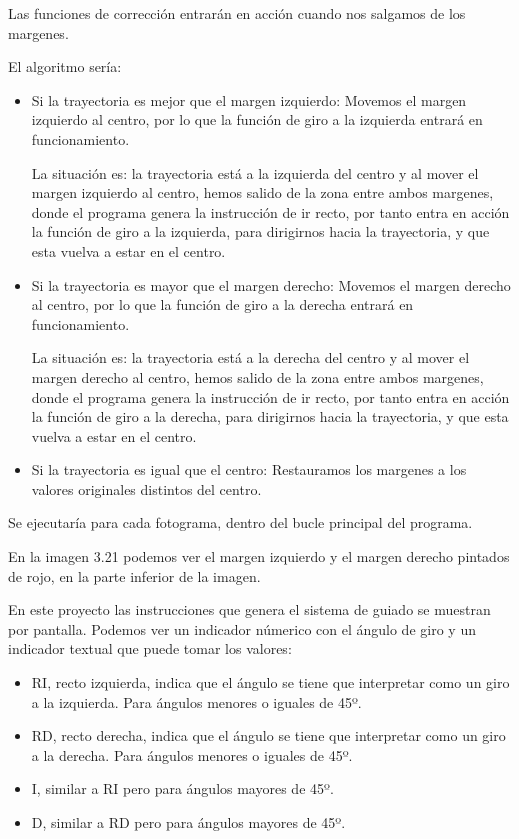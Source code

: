 Las funciones de corrección entrarán en acción cuando nos salgamos de los margenes. 

El algoritmo sería:

\begin{itemize}
	\item Si la trayectoria es mejor que el margen izquierdo:
	Movemos el margen izquierdo al centro, por lo que la función de giro a la izquierda entrará en funcionamiento. 
	
	La situación es: la trayectoria está a la izquierda del centro y al mover el margen izquierdo al centro, hemos salido de la zona entre ambos margenes, donde el programa genera la instrucción de ir recto, por tanto entra en acción la función de giro a la izquierda, para dirigirnos hacia la trayectoria, y que esta vuelva a estar en el centro.
	
	\item Si la trayectoria es mayor que el margen derecho:
	Movemos el margen derecho al centro, por lo que la función de giro a la derecha entrará en funcionamiento. 
	
	La situación es: la trayectoria está a la derecha del centro y al mover el margen derecho al centro, hemos salido de la zona entre ambos margenes, donde el programa genera la instrucción de ir recto, por tanto entra en acción la función de giro a la derecha, para dirigirnos hacia la trayectoria, y que esta vuelva a estar en el centro.
	
	\item Si la trayectoria es igual que el centro:
	Restauramos los margenes a los valores originales distintos del centro.
	
\end{itemize}

Se ejecutaría para cada fotograma, dentro del bucle principal del programa.

En la imagen 3.21 podemos ver el margen izquierdo y el margen derecho pintados de rojo, en la parte inferior de la imagen.

En este proyecto las instrucciones que genera el sistema de guiado se muestran por pantalla. Podemos ver un indicador númerico con el ángulo de giro y un indicador textual que puede tomar los valores:

\begin{itemize}

	\item RI, recto izquierda, indica que el ángulo se tiene que interpretar como un giro a la izquierda. Para ángulos menores o iguales de 45º.
	
	\item RD, recto derecha, indica que el ángulo se tiene que interpretar como un giro a la derecha. Para ángulos menores o iguales de 45º.
	\item I, similar a RI pero para ángulos mayores de 45º.
	
	\item D, similar a RD pero para ángulos mayores de 45º.
	
\end{itemize}

